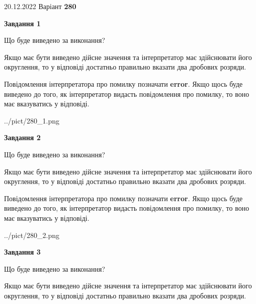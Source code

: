 \documentclass[12pt, ukrainian]{article}
\begin{document}
{20.12.2022 Варіант \No \textbf { 280 }\par}
{
\begin {Large}

{\begin {center}\textbf{Завдання 1}\end {center}}\par
Що буде виведено за виконання? \par

Якщо має бути виведено дійсне значення та інтерпретатор має здійснювати його округлення, 
то у відповіді достатньо правильно вказати два дробових розряди.

Повідомлення інтерпретатора про помилку позначати \textbf{error}.
Якщо щось буде виведено до того, як інтерпретатор видасть повідомлення про помилку, 
то воно має вказуватись у відповіді. \par

\begin{center}
	{../pict/280_1.png}
\end{center}
\newpage

{\begin {center}\textbf{Завдання 2}\end {center}}\par
Що буде виведено за виконання? \par

Якщо має бути виведено дійсне значення та інтерпретатор має здійснювати його округлення, 
то у відповіді достатньо правильно вказати два дробових розряди.

Повідомлення інтерпретатора про помилку позначати \textbf{error}.
Якщо щось буде виведено до того, як інтерпретатор видасть повідомлення про помилку, 
то воно має вказуватись у відповіді. \par

\begin{center}
	{../pict/280_2.png}
\end{center}
\newpage

{\begin {center}\textbf{Завдання 3}\end {center}}\par
Що буде виведено за виконання? \par

Якщо має бути виведено дійсне значення та інтерпретатор має здійснювати його округлення, 
то у відповіді достатньо правильно вказати два дробових розряди.


\end{Large}}
\end{document}
